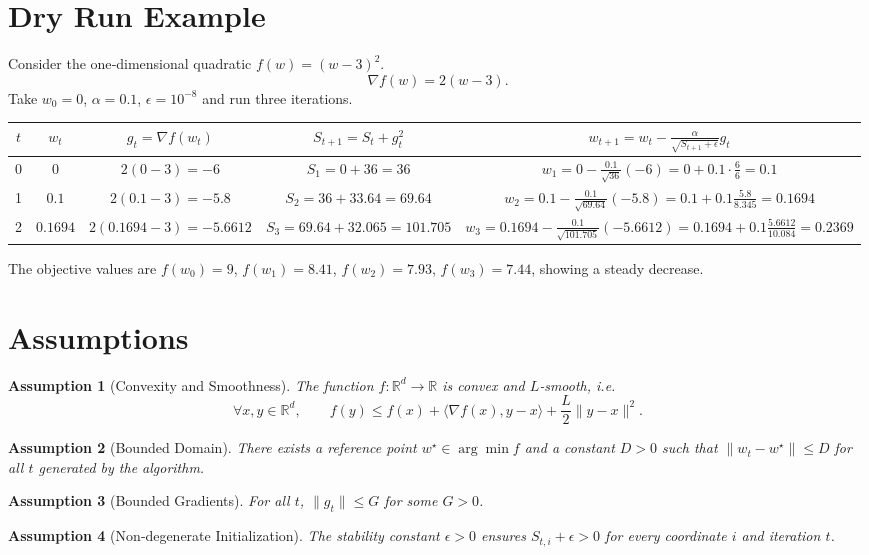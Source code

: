 \documentclass{article}
\newtheorem{assumption}{Assumption}
\newcommand{\R}{\mathbb{R}}
\begin{document}
\section*{Dry Run Example}
Consider the one‑dimensional quadratic $f(w)=(w-3)^2$.
\[
    \nabla f(w)=2(w-3).
\]
Take $w_0=0$, $\alpha=0.1$, $\epsilon=10^{-8}$ and run three iterations.

\begin{center}
\begin{tabular}{c|c|c|c|c}
$t$ & $w_t$ & $g_t= \nabla f(w_t)$ & $S_{t+1}=S_t+g_t^2$ & $w_{t+1}=w_t-\frac{\alpha}{\sqrt{S_{t+1}+\epsilon}}g_t$\\ \hline
0 & $0$ & $2(0-3)=-6$ & $S_1=0+36=36$ &
$w_1=0-\frac{0.1}{\sqrt{36}}(-6)=0+0.1\cdot\frac{6}{6}=0.1$\\[4pt]
1 & $0.1$ & $2(0.1-3)=-5.8$ & $S_2=36+33.64=69.64$ &
$w_2=0.1-\frac{0.1}{\sqrt{69.64}}(-5.8)
=0.1+0.1\frac{5.8}{8.345}=0.1694$\\[4pt]
2 & $0.1694$ & $2(0.1694-3)=-5.6612$ & $S_3=69.64+32.065=101.705$ &
$w_3=0.1694-\frac{0.1}{\sqrt{101.705}}(-5.6612)
=0.1694+0.1\frac{5.6612}{10.084}=0.2369$\\
\end{tabular}
\end{center}
The objective values are $f(w_0)=9$, $f(w_1)=8.41$, $f(w_2)=7.93$, $f(w_3)=7.44$,
showing a steady decrease.

\newpage

\section*{Assumptions}
\begin{assumption}[Convexity and Smoothness]\label{ass:convex}
The function $f:\R^d\rightarrow\R$ is convex and $L$‑smooth, i.e.
\[
    \forall x,y\in\R^d,\qquad 
    f(y)\le f(x)+\langle\nabla f(x),y-x\rangle+\frac{L}{2}\|y-x\|^2 .
\]
\end{assumption}
\begin{assumption}[Bounded Domain]\label{ass:dom}
There exists a reference point $w^{\star}\in\arg\min f$ and a constant
$D>0$ such that $\|w_t-w^{\star}\|\le D$ for all $t$ generated by the
algorithm.
\end{assumption}
\begin{assumption}[Bounded Gradients]\label{ass:grad}
For all $t$, $\|g_t\|\le G$ for some $G>0$.
\end{assumption}
\begin{assumption}[Non‑degenerate Initialization]\label{ass:init}
The stability constant $\epsilon>0$ ensures $S_{t,i}+\epsilon>0$ for every
coordinate $i$ and iteration $t$.
\end{assumption}
\end{document}
